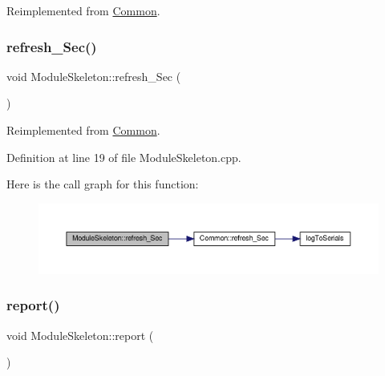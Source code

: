 Reimplemented from \hyperlink{class_common_acd1fdd47fbf8bb490f5c6d3ab6cd8d05}{Common}.

\mbox{\label{class_module_skeleton_ae9b2578a2c1ecb343cd7b3b21320145e}} 
\subsubsection{\texorpdfstring{refresh\+\_\+\+Sec()}{refresh\_Sec()}\hspace{0.1cm}{\footnotesize\ttfamily [2/2]}}
{\footnotesize\ttfamily void Module\+Skeleton\+::refresh\+\_\+\+Sec (\begin{DoxyParamCaption}{ }\end{DoxyParamCaption})\hspace{0.3cm}{\ttfamily [virtual]}}



Reimplemented from \hyperlink{class_common_acd1fdd47fbf8bb490f5c6d3ab6cd8d05}{Common}.



Definition at line 19 of file Module\+Skeleton.\+cpp.

Here is the call graph for this function\+:
\nopagebreak
\begin{figure}[H]
\begin{center}
\leavevmode
\includegraphics[width=350pt]{class_module_skeleton_ae9b2578a2c1ecb343cd7b3b21320145e_cgraph}
\end{center}
\end{figure}
\mbox{\label{class_module_skeleton_a4b13bbc3ce0282781e36f450bd4f189a}} 
\subsubsection{\texorpdfstring{report()}{report()}\hspace{0.1cm}{\footnotesize\ttfamily [1/2]}}
{\footnotesize\ttfamily void Module\+Skeleton\+::report (\begin{DoxyParamCaption}{ }\end{DoxyParamCaption})\hspace{0.3cm}{\ttfamily [virtual]}}




